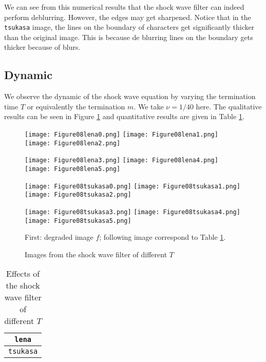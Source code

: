 \documentclass[english, nochinese]{pnote}
\begin{document}
We can see from this numerical results that the shock wave filter can indeed perform deblurring. However, the edges may get sharpened. Notice that in the \verb"tsukasa" image, the lines on the boundary of characters get significantly thicker than the original image. This is because de blurring lines on the boundary gets thicker because of blurs.

\subsection{Dynamic}

We observe the dynamic of the shock wave equation by varying the termination time $T$ or equivalently the termination $m$. We take $ \nu = 1 / 40 $ here. The qualitative results can be seen in Figure \ref{Fig:ShockDyn} and quantitative results are given in Table \ref{Tbl:ShockDyn}.

\begin{figure}[htb]
{
\centering

\texttt{[image: Figure08lena0.png]}
\texttt{[image: Figure08lena1.png]}
\texttt{[image: Figure08lena2.png]}

\texttt{[image: Figure08lena3.png]}
\texttt{[image: Figure08lena4.png]}
\texttt{[image: Figure08lena5.png]}

\texttt{[image: Figure08tsukasa0.png]}
\texttt{[image: Figure08tsukasa1.png]}
\texttt{[image: Figure08tsukasa2.png]}

\texttt{[image: Figure08tsukasa3.png]}
\texttt{[image: Figure08tsukasa4.png]}
\texttt{[image: Figure08tsukasa5.png]}

\caption{Images from the shock wave filter of different $T$}
\label{Fig:ShockDyn}
}
{
\footnotesize First: degraded image $f$; following image correspond to Table \ref{Tbl:ShockDyn}.
}
\end{figure}

\begin{table}[htb]
\centering
\begin{tabular}{|c|c|c|c|c|c|c|}
\hline
\multicolumn{7}{|c|}{\texttt{lena}} \\
\hline

\multicolumn{7}{|c|}{\texttt{tsukasa}} \\
\hline

\end{tabular}
\caption{Effects of the shock wave filter of different $T$}
\label{Tbl:ShockDyn}
\end{table}
\end{document}
